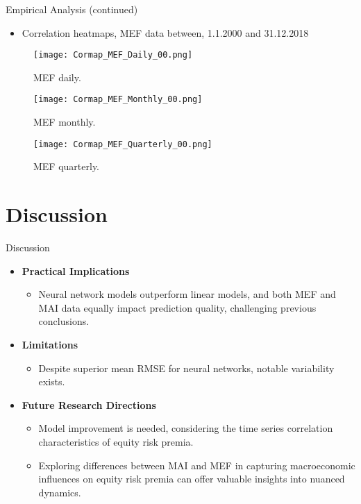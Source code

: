 \documentclass{beamer}
\begin{document}
\begin{frame}{Empirical Analysis (continued)}
  \begin{itemize}
    \item{ Correlation heatmaps, MEF data between, 1.1.2000 and 31.12.2018}
  \end{itemize}

  \begin{figure}[H]
    \centering
    \begin{minipage}{0.32\textwidth}
      \centering
      \texttt{[image: Cormap\_MEF\_Daily\_00.png]}
      \caption{MEF daily.}
      \label{fig:linear_prediction}
    \end{minipage}\hfill
    \begin{minipage}{0.32\textwidth}
      \centering
      \texttt{[image: Cormap\_MEF\_Monthly\_00.png]}
      \caption{MEF monthly.}
      \label{fig:nn_prediction}
    \end{minipage}\hfill
    \begin{minipage}{0.32\textwidth}
      \centering
      \texttt{[image: Cormap\_MEF\_Quarterly\_00.png]} 
      \caption{MEF quarterly.}
      \label{fig:third_prediction}
    \end{minipage}
  \end{figure}
\end{frame}

\section{Discussion}
\begin{frame}{Discussion}
  \begin{itemize}
    \item \textbf{Practical Implications} 
    \begin{itemize}
        \item Neural network models outperform linear models, and both MEF and MAI data equally impact prediction quality, challenging previous conclusions.
    \end{itemize}
    \item \textbf{Limitations}
    \begin{itemize}
        \item Despite superior mean RMSE for neural networks, notable variability exists.
    \end{itemize}
    \item \textbf{Future Research Directions}
    \begin{itemize}
        \item Model improvement is needed, considering the time series correlation characteristics of equity risk premia.
        \item Exploring differences between MAI and MEF in capturing macroeconomic influences on equity risk premia can offer valuable insights into nuanced dynamics.
    \end{itemize}
  \end{itemize}
\end{frame}
\end{document}
